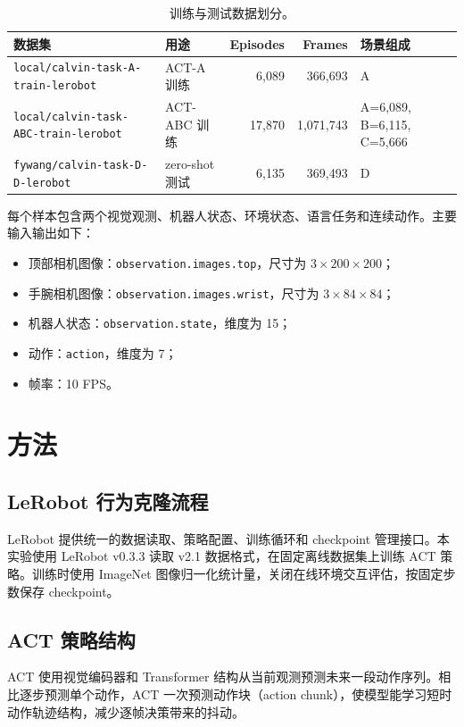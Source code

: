 \documentclass[11pt,a4paper]{ctexart}
\begin{document}
\begin{table}[H]
\centering
\caption{训练与测试数据划分。}
\begin{tabular}{llrrl}
\toprule
数据集 & 用途 & Episodes & Frames & 场景组成 \\
\midrule
\texttt{local/calvin-task-A-train-lerobot} & ACT-A 训练 & 6,089 & 366,693 & A \\
\texttt{local/calvin-task-ABC-train-lerobot} & ACT-ABC 训练 & 17,870 & 1,071,743 & A=6,089, B=6,115, C=5,666 \\
\texttt{fywang/calvin-task-D-D-lerobot} & zero-shot 测试 & 6,135 & 369,493 & D \\
\bottomrule
\end{tabular}
\end{table}

每个样本包含两个视觉观测、机器人状态、环境状态、语言任务和连续动作。主要输入输出如下：
\begin{itemize}
  \item 顶部相机图像：\texttt{observation.images.top}，尺寸为 $3 \times 200 \times 200$；
  \item 手腕相机图像：\texttt{observation.images.wrist}，尺寸为 $3 \times 84 \times 84$；
  \item 机器人状态：\texttt{observation.state}，维度为 15；
  \item 动作：\texttt{action}，维度为 7；
  \item 帧率：10 FPS。
\end{itemize}

\section{方法}
\subsection{LeRobot 行为克隆流程}
LeRobot 提供统一的数据读取、策略配置、训练循环和 checkpoint 管理接口。本实验使用 LeRobot v0.3.3 读取 v2.1 数据格式，在固定离线数据集上训练 ACT 策略。训练时使用 ImageNet 图像归一化统计量，关闭在线环境交互评估，按固定步数保存 checkpoint。

\subsection{ACT 策略结构}
ACT 使用视觉编码器和 Transformer 结构从当前观测预测未来一段动作序列。相比逐步预测单个动作，ACT 一次预测动作块（action chunk），使模型能学习短时动作轨迹结构，减少逐帧决策带来的抖动。
\end{document}
